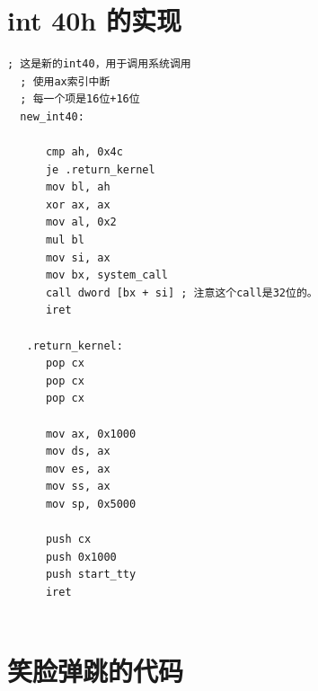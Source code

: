 \documentclass[forprint]{WHUBachelor}
\begin{document}
\chapter{int 40h 的实现}

\label{code:int_40h}
\begin{lstlisting}[language={[x86masm]Assembler}] 
  ; 这是新的int40，用于调用系统调用
  ; 使用ax索引中断
  ; 每一个项是16位+16位 
  new_int40:
  
      cmp ah, 0x4c
      je .return_kernel
      mov bl, ah
      xor ax, ax
      mov al, 0x2
      mul bl
      mov si, ax
      mov bx, system_call
      call dword [bx + si] ; 注意这个call是32位的。
      iret
  
   .return_kernel:
      pop cx
      pop cx
      pop cx
  
      mov ax, 0x1000
      mov ds, ax
      mov es, ax
      mov ss, ax
      mov sp, 0x5000
  
      push cx
      push 0x1000
      push start_tty
      iret
  
\end{lstlisting}



\chapter{笑脸弹跳的代码}

\label{code:jump}
\begin{lstlisting}[language={[x86masm]Assembler}]
 
\end{lstlisting}


\cleardoublepage
\end{document}
